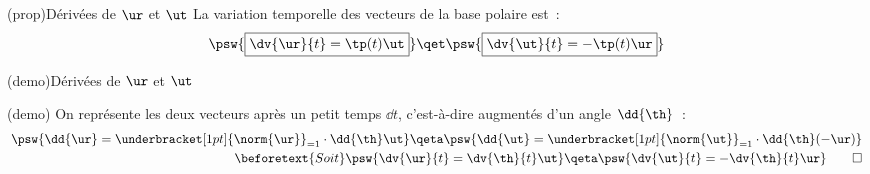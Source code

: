 \documentclass[../../main/main.tex]{subfiles}
\begin{document}
\begin{tcb*}(prop){Dérivées de $\protect\ur$ et $\protect\ut$}
  La variation temporelle des vecteurs de la base polaire est~:
  \[
    \psw{%
      \boxed{\dv{\ur}{t} = \tp(t)\ut}
    }%
    \qet
    \psw{%
      \boxed{\dv{\ut}{t} = -\tp(t)\ur}
    }%
  \]
  \vspace{-15pt}
\end{tcb*}

\begin{tcb*}[breakable](demo){Dérivées de $\protect\ur$ et $\protect\ut$}
  \begin{isd}[interior hidden, righthand ratio=.3](demo)
  On représente les deux vecteurs après un petit temps $\dd{t}$, c'est-à-dire
  augmentés d'un angle $\dd{\th}$~:
      \begin{align*}
        \psw{%
          \dd{\ur} = \underbracket[1pt]{\norm{\ur}}_{=1}\cdot \dd{\th} \ut
        }%
        \qeta
        \psw{%
          \dd{\ut} = \underbracket[1pt]{\norm{\ut}}_{=1}\cdot \dd{\th} (-\ur)
        }%
        \\\beforetext{Soit}
        \psw{%
          \dv{\ur}{t} = \dv{\th}{t}\ut
        }%
        \qeta
        \psw{%
          \dv{\ut}{t} = -\dv{\th}{t}\ur
        }%
        \qed
      \end{align*}
    \tcblower
    \begin{center}
\end{center}
\end{isd}
\end{tcb*}
\end{document}
